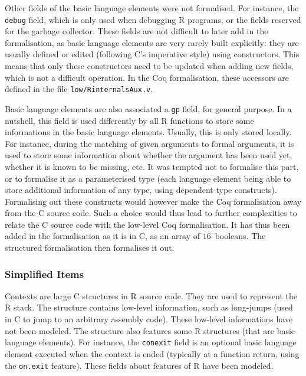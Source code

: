 \documentclass{article}
\newcommand\Coq{Coq}
\newcommand\R{R}
\newcommand\Cn{C}
\begin{document}
Other fields of the basic language elements were not formalised.
For instance, the \texttt{debug} field,
which is only used when debugging \R{} programs,
or the fields reserved for the garbage collector.
These fields are not difficult to later add in the formalisation,
as basic language elements are very rarely built explicitly:
they are usually defined or edited (following \Cn{}'s imperative style)
using constructors.
This means that only these constructors need to be updated
when adding new fields,
which is not a difficult operation.
In the \Coq{} formalisation, these accessors are defined in the file
\texttt{low/RinternalsAux.v}.

Basic language elements are also associated a \texttt{gp} field,
for general purpose.
In a nutshell, this field is used differently by all \R{} functions
to store some informations in the basic language elements.
Usually, this is only stored locally.
For instance, during the matching of given arguments to formal arguments,
it is used to store some information about whether the argument
has been used yet, whether it is known to be missing, etc.
It was tempted not to formalise this part,
or to formalise it as a parameterised type
(each language element being able to store additional information
of any type, using dependent-type constructs).
Formalising out these constructs would however make the \Coq{}
formalisation away from the \Cn{} source code.
Such a choice would thus lead to further complexities to relate
the \Cn{} source code with the low-level \Coq{} formalisation.
It has thus been added in the formalisation as it is in \Cn{},
as an array of \(16\)~booleans.
The structured formalisation then formalises it out.


\subsubsection{Simplified Items}

Contexts are large \Cn{} structures in \R{} source code.
They are used to represent the \R{} stack.
The structure contains low-level information,
such as long-jumps
(used in \Cn{} to jump to an arbitrary assembly code).
These low-level informations have not been modeled.
The structure also features some \R{} structures
(that are basic language elements).
For instance, the \texttt{conexit} field
is an optional basic language element executed when
the context is ended
(typically at a function return,
using the \texttt{on.exit} feature).
These fields about features of \R{} have been modeled.
\end{document}
